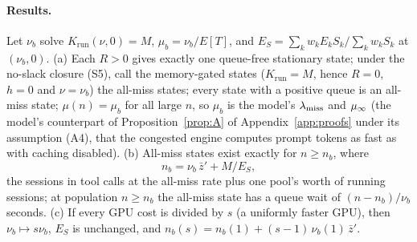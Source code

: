 \paragraph{Results.}\label{sec:fp-results}
\begin{proposition}\label{prop:nb}
Let $\nu_b$ solve $K_{\mathrm{run}}(\nu,0)=M$, $\mu_b=\nu_b/E[T]$, and $E_S=\sum_kw_kE_kS_k/\sum_kw_kS_k$ at $(\nu_b,0)$.
(a) Each $R>0$ gives exactly one queue-free stationary state; under the no-slack closure (S5), call the memory-gated states ($K_{\mathrm{run}}=M$, hence $R=0$, $h=0$ and $\nu=\nu_b$) the all-miss states; every state with a positive queue is an all-miss state; $\mu(n)=\mu_b$ for all large $n$, so $\mu_b$ is the model's $\lambda_{\mathrm{miss}}$ and $\mu_{\infty}$ (the model's counterpart of Proposition~\ref{prop:A} of Appendix~\ref{app:proofs} under its assumption (A4), that the congested engine computes prompt tokens as fast as with caching disabled).
(b) All-miss states exist exactly for $n\ge n_b$, where
\begin{equation}\label{eq:nb}
n_b=\nu_b\,\bar z'+M/E_S,
\end{equation}
the sessions in tool calls at the all-miss rate plus one pool's worth of running sessions; at population $n\ge n_b$ the all-miss state has a queue wait of $(n-n_b)/\nu_b$ seconds.
(c) If every GPU cost is divided by $s$ (a uniformly faster GPU), then $\nu_b\mapsto s\nu_b$, $E_S$ is unchanged, and $n_b(s)=n_b(1)+(s-1)\,\nu_b(1)\,\bar z'$.
\end{proposition}
